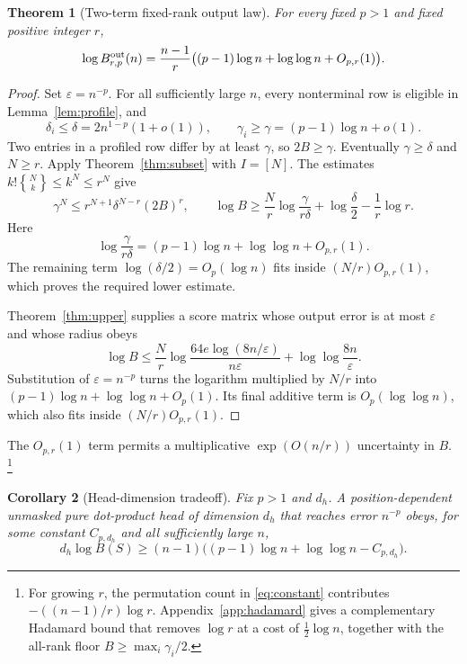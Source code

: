 \documentclass[10pt]{article}
\newtheorem{theorem}{Theorem}
\newtheorem{corollary}[theorem]{Corollary}
\theoremstyle{definition}
\newcommand{\Stirling}[2]{\genfrac{\{}{\}}{0pt}{}{#1}{#2}}
\begin{document}
\begin{theorem}[Two-term fixed-rank output law]\label{thm:sharp}
For every fixed \(p>1\) and fixed positive integer \(r\),
\begin{equation}\label{eq:sharp}
 \log B^{\rm out}_{r,p}(n)
 =\frac{n-1}{r}
 \bigl((p-1)\log n+\log\log n+O_{p,r}(1)\bigr).
\end{equation}
\end{theorem}

\begin{proof}
Set \(\varepsilon=n^{-p}\).  For all sufficiently large \(n\), every
nonterminal row is eligible in Lemma~\ref{lem:profile}, and
\[
 \delta_i\le\delta=2n^{1-p}(1+o(1)),\qquad
 \gamma_i\ge\gamma=(p-1)\log n+o(1).
\]
Two entries in a profiled row differ by at least \(\gamma\), so
\(2B\ge\gamma\).  Eventually \(\gamma\ge\delta\) and \(N\ge r\).  Apply
Theorem~\ref{thm:subset} with \(I=[N]\).  The estimates
\(k!\Stirling{N}{k}\le k^N\le r^N\) give
\[
 \gamma^N\le r^{N+1}\delta^{N-r}(2B)^r,
 \qquad
 \log B\ge\frac Nr\log\frac{\gamma}{r\delta}
 +\log\frac{\delta}{2}-\frac1r\log r.
\]
Here
\[
 \log\frac{\gamma}{r\delta}
 =(p-1)\log n+\log\log n+O_{p,r}(1).
\]
The remaining term \(\log(\delta/2)=O_p(\log n)\) fits inside
\((N/r)O_{p,r}(1)\), which proves the required lower estimate.

Theorem~\ref{thm:upper} supplies a score matrix whose output error is at most
\(\varepsilon\) and whose radius obeys
\[
 \log B\le\frac Nr
 \log\frac{64e\log(8n/\varepsilon)}{n\varepsilon}
 +\log\log\frac{8n}{\varepsilon}.
\]
Substitution of \(\varepsilon=n^{-p}\) turns the logarithm multiplied by
\(N/r\) into
\((p-1)\log n+\log\log n+O_p(1)\).  Its final additive term is
\(O_p(\log\log n)\), which also fits inside \((N/r)O_{p,r}(1)\).
\end{proof}

The \(O_{p,r}(1)\) term permits a multiplicative
\(\exp(O(n/r))\) uncertainty in \(B\).
\footnote{For growing \(r\), the permutation count in
\eqref{eq:constant} contributes \(-((n-1)/r)\log r\).
Appendix~\ref{app:hadamard} gives a complementary Hadamard bound that removes
\(\log r\) at a cost of \(\tfrac12\log n\), together with the all-rank floor
\(B\ge\max_i\gamma_i/2\).}

\begin{corollary}[Head-dimension tradeoff]\label{cor:head}
Fix \(p>1\) and \(d_h\).  A position-dependent unmasked pure dot-product
head of dimension
\(d_h\) that reaches error \(n^{-p}\) obeys, for some constant
\(C_{p,d_h}\) and all sufficiently large \(n\),
\[
 d_h\log B(S)\ge
 (n-1)\bigl((p-1)\log n+\log\log n-C_{p,d_h}\bigr).
\]
\end{corollary}
\end{document}
